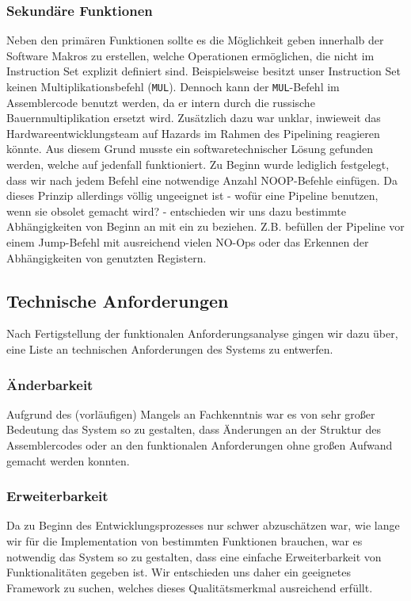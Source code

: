 \documentclass[paper=a4,fontsize=12pt,twocolumn]{scrreprt}
\begin{document}
\subsubsection{Sekundäre Funktionen}
Neben den primären Funktionen sollte es die Möglichkeit geben innerhalb der Software Makros zu erstellen, welche Operationen ermöglichen, die nicht im Instruction Set explizit definiert sind.
Beispielsweise besitzt unser Instruction Set keinen Multiplikationsbefehl (\texttt{MUL}).
Dennoch kann der \texttt{MUL}-Befehl im Assemblercode benutzt werden, da er intern durch die russische Bauernmultiplikation ersetzt wird.
Zusätzlich dazu war unklar, inwieweit das Hardwareentwicklungsteam auf Hazards im Rahmen des Pipelining reagieren könnte.
Aus diesem Grund musste ein softwaretechnischer Lösung  gefunden werden, welche auf jedenfall funktioniert.
Zu Beginn wurde lediglich festgelegt, dass wir nach jedem Befehl eine notwendige Anzahl NOOP-Befehle einfügen.
Da dieses Prinzip allerdings völlig ungeeignet ist - wofür eine Pipeline benutzen, wenn sie obsolet gemacht wird? - entschieden wir uns dazu bestimmte Abhängigkeiten von Beginn an mit ein zu beziehen.
Z.B. befüllen der Pipeline vor einem Jump-Befehl mit ausreichend vielen NO-Ops oder das Erkennen der Abhängigkeiten von genutzten Registern.

\subsection{Technische Anforderungen}
Nach Fertigstellung der funktionalen Anforderungsanalyse gingen wir dazu über, eine Liste an technischen Anforderungen des Systems zu entwerfen.

\subsubsection{Änderbarkeit}
Aufgrund des (vorläufigen) Mangels an Fachkenntnis war es von sehr großer Bedeutung das System so zu gestalten, dass Änderungen an der Struktur des Assemblercodes oder an den funktionalen Anforderungen ohne großen Aufwand gemacht werden konnten.

\subsubsection{Erweiterbarkeit}
Da zu Beginn des Entwicklungsprozesses nur schwer abzuschätzen war, wie lange wir für die Implementation von bestimmten Funktionen brauchen, war es notwendig das System so zu gestalten, dass eine einfache Erweiterbarkeit von Funktionalitäten gegeben ist.
Wir entschieden uns daher ein geeignetes Framework zu suchen, welches dieses Qualitätsmerkmal ausreichend erfüllt. 
\end{document}
